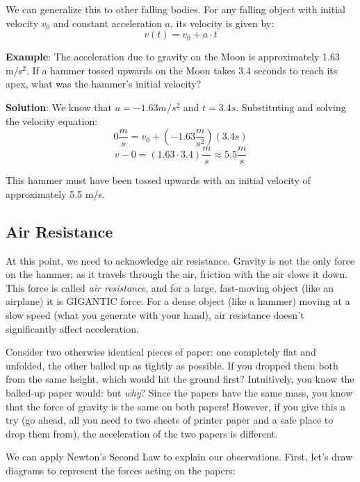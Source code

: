 We can generalize this to other falling bodies. For any falling object with 
initial velocity  $v_0$ and constant acceleration $a$, its velocity is given 
by:
$$v(t) = v_0 + a \cdot t$$

\textbf{Example}: The acceleration due to gravity on the Moon is approximately 
1.63 m/s$^2$. If a hammer tossed upwards on the Moon takes 3.4 seconds to reach 
its apex, what was the hammer's initial velocity?

\textbf{Solution}: We know that $a = -1.63 m/s^2$ and $t = 3.4s$. Substituting 
and solving the velocity equation:
$$0 \frac{m}{s} = v_0 + \left( -1.63 \frac{m}{s^2} \right) \left( 3.4 s \right)$$
$$v-0 = \left( 1.63 \cdot 3.4 \right) \frac{m}{s} \approx 5.5 \frac{m}{s}$$

This hammer must have been tossed upwards with an initial velocity of 
approximately 5.5 m/s.

\subsection{Air Resistance}

At this point, we need to acknowledge air resistance. Gravity
is not the only force on the hammer; as it travels through the air,
friction with the air slows it down. This force is called \emph{air resistance},
and for a large, fast-moving object (like an airplane) it is GIGANTIC force. 
For a dense object (like a hammer) moving at a slow speed (what you generate
with your hand), air resistance doesn't significantly affect acceleration.

Consider two otherwise identical pieces of paper: one completely flat and 
unfolded, the other balled up as tightly as possible. If you dropped them both 
from the same height, which would hit the ground first? Intuitively, you know 
the balled-up paper would: but \textit{why}? Since the papers have the same 
mass, you know that the force of gravity is the same on both papers! However, 
if you give this a try (go ahead, all you need to two sheets of printer paper 
and a safe place to drop them from), the acceleration of the two papers is 
different. 

We can apply Newton's Second Law to explain our observations. First, let's draw 
diagrams to represent the forces acting on the papers:

